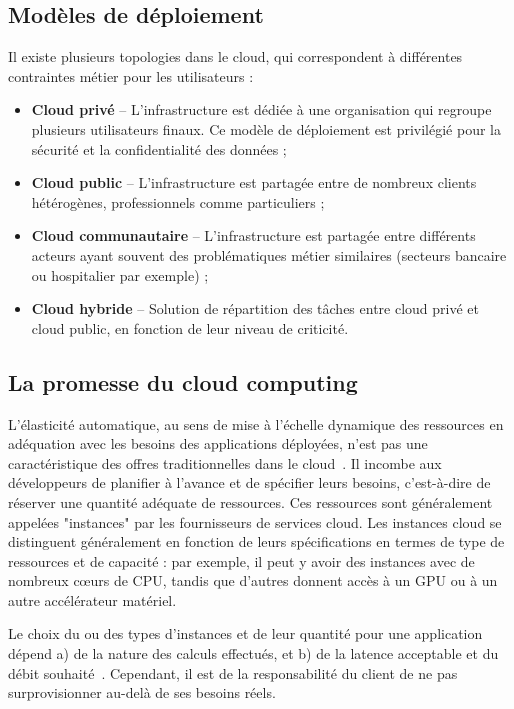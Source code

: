 \subsection{Modèles de déploiement}

Il existe plusieurs topologies dans le cloud, qui correspondent à différentes contraintes métier pour les utilisateurs :

\begin{itemize}
    \item \textbf{Cloud privé} -- L'infrastructure est dédiée à une organisation qui regroupe plusieurs utilisateurs finaux. Ce modèle de déploiement est privilégié pour la sécurité et la confidentialité des données ;
    \item \textbf{Cloud public} -- L'infrastructure est partagée entre de nombreux clients hétérogènes, professionnels comme particuliers ;
    \item \textbf{Cloud communautaire} -- L'infrastructure est partagée entre différents acteurs ayant souvent des problématiques métier similaires (secteurs bancaire ou hospitalier par exemple) ;
    \item \textbf{Cloud hybride} -- Solution de répartition des tâches entre cloud privé et cloud public, en fonction de leur niveau de criticité.
\end{itemize}

\subsection{La promesse du cloud computing}

L'élasticité automatique, au sens de mise à l'échelle dynamique des ressources en adéquation avec les besoins des applications déployées, n'est pas une caractéristique des offres traditionnelles dans le cloud~\cite{herbstElasticityCloudComputing}. Il incombe aux développeurs de planifier à l'avance et de spécifier leurs besoins, c'est-à-dire de réserver une quantité adéquate de ressources. Ces ressources sont généralement appelées "instances" par les fournisseurs de services cloud. Les instances cloud se distinguent généralement en fonction de leurs spécifications en termes de type de ressources et de capacité : par exemple, il peut y avoir des instances avec de nombreux cœurs de CPU, tandis que d'autres donnent accès à un GPU ou à un autre accélérateur matériel.

Le choix du ou des types d'instances et de leur quantité pour une application dépend a) de la nature des calculs effectués, et b) de la latence acceptable et du débit souhaité~\cite{yallesRISCLESSReinforcementLearning}. Cependant, il est de la responsabilité du client de ne pas surprovisionner au-delà de ses besoins réels.

